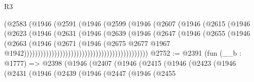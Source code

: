 \begin{lexlean}{R3}
\begin{coremodule}
                                            (@2583
                                              (@1946
                                                (@2591
                                                  (@1946
                                                    (@2599
                                                      (@1946
                                                        (@2607
                                                          (@1946
                                                            (@2615
                                                              (@1946
                                                                (@2623
                                                                  (@1946
                                                                    (@2631
                                                                      (@1946
                                                                        (@2639
                                                                          (@1946
                                                                            (@2647
                                                                              (@1946
                                                                                (@2655
                                                                                  (@1946
                                                                                    (@2663
                                                                                      (@1946
                                                                                        (@2671
                                                                                          (@1946
                                                                                            (@2675
                                                                                              @2677
                                                                                              @1967
                                                                                              @1942)))))))))))))))))))))))))))))))))))))))))))))
@2752 := @2391
    (fun (__b : @1777) =>
    @2398
      (@1946
        (@2407
          (@1946
            (@2415
              (@1946
                (@2423
                  (@1946
                    (@2431
                      (@1946
                        (@2439
                          (@1946
                            (@2447
                              (@1946
                                (@2455

\end{coremodule}
\end{lexlean}
